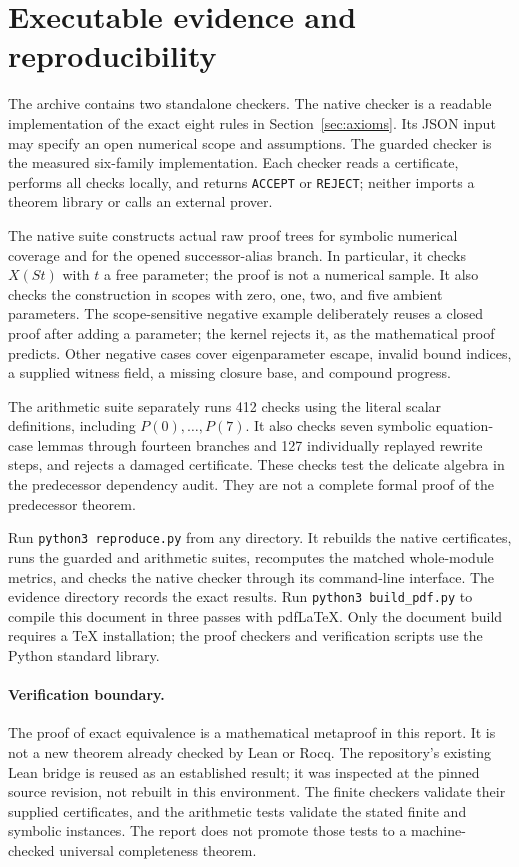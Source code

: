 \documentclass[11pt]{article}
\theoremstyle{definition}
\theoremstyle{remark}
\begin{document}


\section{Executable evidence and reproducibility}

The archive contains two standalone checkers. The native checker is a
readable implementation of the exact eight rules in
Section~\ref{sec:axioms}. Its JSON input may specify an open numerical
scope and assumptions. The guarded checker is the measured six-family
implementation. Each checker reads a certificate, performs all checks
locally, and returns \texttt{ACCEPT} or \texttt{REJECT}; neither imports
a theorem library or calls an external prover.

The native suite constructs actual raw proof trees for symbolic numerical
coverage and for the opened successor-alias branch. In particular, it
checks $X(St)$ with $t$ a free parameter; the proof is not a numerical
sample. It also checks the construction in scopes with zero, one, two,
and five ambient parameters. The scope-sensitive negative example
deliberately reuses a closed proof after adding a parameter; the kernel
rejects it, as the mathematical proof predicts. Other negative cases
cover eigenparameter escape, invalid bound indices, a supplied witness
field, a missing closure base, and compound progress.

The arithmetic suite separately runs 412 checks using the literal scalar
definitions, including $P(0),\ldots,P(7)$. It also checks seven symbolic
equation-case lemmas through fourteen branches and 127 individually
replayed rewrite steps, and rejects a damaged certificate. These checks
test the delicate algebra in the predecessor dependency audit. They
are not a complete formal proof of the predecessor theorem.

Run \texttt{python3 reproduce.py} from any directory. It rebuilds the
native certificates, runs the guarded and arithmetic suites, recomputes
the matched whole-module metrics, and checks the native checker through
its command-line interface. The evidence directory records the exact
results. Run \texttt{python3 build\_pdf.py} to compile this document in three passes
with pdfLaTeX. Only the document build requires a TeX installation;
the proof checkers and verification scripts use the Python standard
library.

\paragraph{Verification boundary.}
The proof of exact equivalence is a mathematical metaproof in this
report. It is not a new theorem already checked by Lean or Rocq. The
repository's existing Lean bridge is reused as an established result;
it was inspected at the pinned source revision, not rebuilt in this
environment. The finite checkers validate their supplied certificates,
and the arithmetic tests validate the stated finite and symbolic
instances. The report does not promote those tests to a machine-checked
universal completeness theorem.
\end{document}
